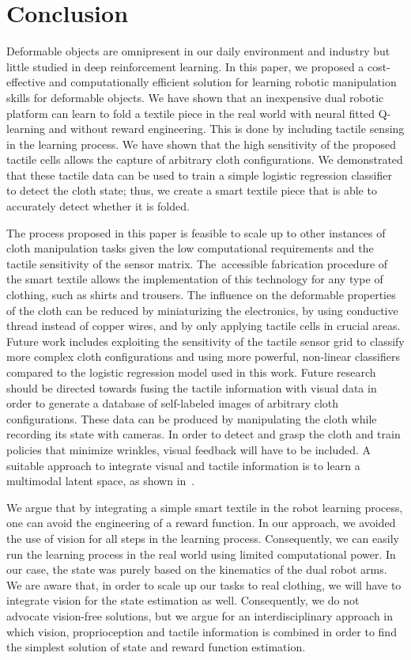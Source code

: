 \documentclass[\home/main.tex]{subfiles}
\begin{document}

\section{Conclusion}

Deformable objects are omnipresent in our daily environment and industry but little studied in deep reinforcement learning. In this paper, we proposed a cost-effective and computationally efficient solution for learning robotic manipulation skills for deformable objects. We have shown that an inexpensive dual robotic platform can learn to fold a textile piece in the real world with neural fitted Q-learning and without reward engineering. This is done by including tactile sensing in the learning process. We have shown that the high sensitivity of the proposed tactile cells allows the capture of arbitrary cloth configurations. We demonstrated that these tactile data can be used to train a simple logistic regression classifier to detect the cloth state; thus, we create a smart textile piece that is able to accurately detect whether it is folded.

The process proposed in this paper is feasible to scale up to other instances of cloth manipulation tasks given the low computational requirements and the tactile sensitivity of the sensor matrix. The~accessible fabrication procedure of the smart textile allows the implementation of this technology for any type of clothing, such as shirts and trousers. The influence on the deformable properties of the cloth can be reduced by miniaturizing the electronics, by using conductive thread instead of copper wires, and by only applying tactile cells in crucial areas. Future work includes exploiting the sensitivity of the tactile sensor grid to classify more complex cloth configurations and using more powerful, non-linear classifiers compared to the logistic regression model used in this work. Future research should be directed towards fusing the tactile information with visual data in order to generate a database of self-labeled images of arbitrary cloth configurations. These data can be produced by manipulating the cloth while recording its state with cameras. In order to detect and grasp the cloth and train policies that minimize wrinkles, visual feedback will have to be included. A suitable approach to integrate visual and tactile information is to learn a multimodal latent space, as shown in~\cite{Lee2019}.

We argue that by integrating a simple smart textile in the robot learning process, one can avoid the engineering of a reward function. In our approach, we avoided the use of vision for all steps in the learning process. Consequently, we can easily run the learning process in the real world using limited computational power. In our case, the state was purely based on the kinematics of the dual robot arms. We are aware that, in order to scale up our tasks to real clothing, we will have to integrate vision for the state estimation as well. Consequently, we do not advocate vision-free solutions, but we argue for an interdisciplinary approach in which vision, proprioception and tactile information is combined in order to find the simplest solution of state and reward function estimation.
\end{document}
